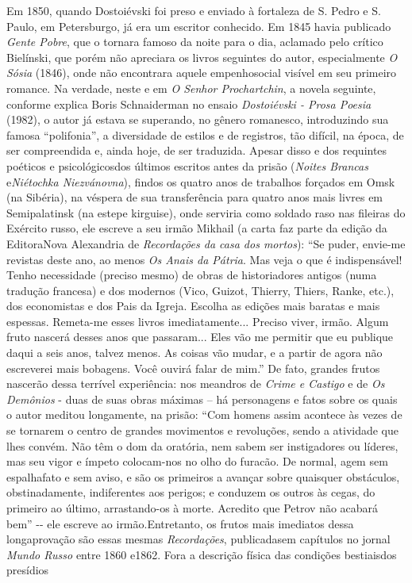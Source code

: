 Em 1850, quando Dostoiévski foi preso e enviado à fortaleza de S. Pedro
e S. Paulo, em Petersburgo, já era um escritor conhecido. Em 1845 havia
publicado \emph{Gente Pobre}, que o tornara famoso da noite para o dia,
aclamado pelo crítico Bielínski, que porém não apreciara os livros
seguintes do autor, especialmente \emph{O Sósia} (1846), onde não
encontrara aquele empenhosocial visível em seu primeiro romance. Na
verdade, neste e em \emph{O Senhor Prochartchin}, a novela seguinte,
conforme explica Boris Schnaiderman no ensaio \emph{Dostoiévski - Prosa
Poesia} (1982), o autor já estava se superando, no gênero romanesco,
introduzindo sua famosa ``polifonia'', a diversidade de estilos e de
registros, tão difícil, na época, de ser compreendida e, ainda hoje, de
ser traduzida. Apesar disso e dos requintes poéticos e psicológicosdos
últimos escritos antes da prisão (\emph{Noites Brancas} e\emph{Niétochka
Niezvánovna}), findos os quatro anos de trabalhos forçados em Omsk (na
Sibéria), na véspera de sua transferência para quatro anos mais livres
em Semipalatinsk (na estepe kirguise), onde serviria como soldado raso
nas fileiras do Exército russo, ele escreve a seu irmão Mikhail (a carta
faz parte da edição da EditoraNova Alexandria de \emph{Recordações da
casa dos mortos}): ``Se puder, envie-me revistas deste ano, ao menos
\emph{Os Anais da Pátria}. Mas veja o que é indispensável! Tenho
necessidade (preciso mesmo) de obras de historiadores antigos (numa
tradução francesa) e dos modernos (Vico, Guizot, Thierry, Thiers, Ranke,
etc.), dos economistas e dos Pais da Igreja. Escolha as edições mais
baratas e mais espessas. Remeta-me esses livros imediatamente... Preciso
viver, irmão. Algum fruto nascerá desses anos que passaram... Eles vão
me permitir que eu publique daqui a seis anos, talvez menos. As coisas
vão mudar, e a partir de agora não escreverei mais bobagens. Você ouvirá
falar de mim.'' De fato, grandes frutos nascerão dessa terrível
experiência: nos meandros de \emph{Crime e Castigo} e de \emph{Os
Demônios} - duas de suas obras máximas -- há personagens e fatos sobre
os quais o autor meditou longamente, na prisão: ``Com homens assim
acontece às vezes de se tornarem o centro de grandes movimentos e
revoluções, sendo a atividade que lhes convém. Não têm o dom da
oratória, nem sabem ser instigadores ou líderes, mas seu vigor e ímpeto
colocam-nos no olho do furacão. De normal, agem sem espalhafato e sem
aviso, e são os primeiros a avançar sobre quaisquer obstáculos,
obstinadamente, indiferentes aos perigos; e conduzem os outros às cegas,
do primeiro ao último, arrastando-os à morte. Acredito que Petrov não
acabará bem'' -\/- ele escreve ao irmão.Entretanto, os frutos mais
imediatos dessa longaprovação são essas mesmas \emph{Recordações},
publicadasem capítulos no jornal \emph{Mundo Russo} entre 1860 e1862.
Fora a descrição física das condições bestiaisdos presídios

